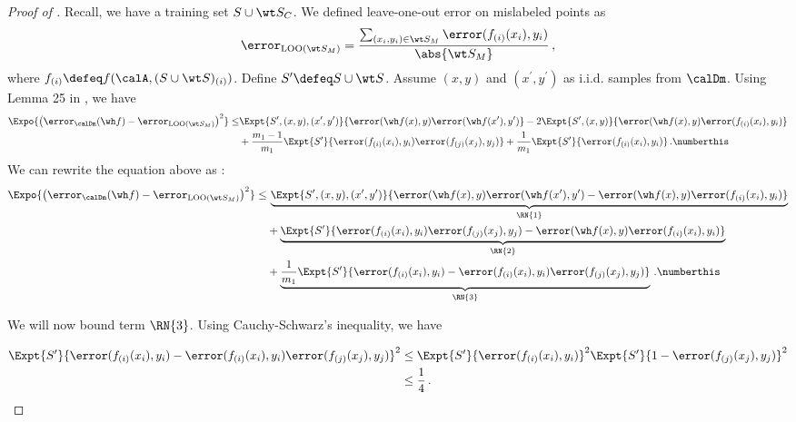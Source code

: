 \begin{proof}[Proof of ]
    Recall, we have a training set $S \cup \wt S_C$. We defined leave-one-out error on mislabeled points as $$\error_{\text{LOO}(\wt S_M) } = \frac{\sum_{(x_i, y_i) \in \wt S_M} \error( f_{(i)}( x_i), y_i)}{ \abs{\wt S_M }} \,, $$
    where $f_{(i)} \defeq f(\calA, (S \cup \wt S)_{(i)})$. Define $S^\prime \defeq S \cup \wt S$. Assume $(x,y)$ and $(x^\prime,y^\prime)$ as i.i.d. samples from ${\calDm}$. 
    Using Lemma 25 in \citet{bousquet2002stability}, we have
    \begin{align*}
        \Expo{ \left( \error_{\calDm}(\wh f) -\error_{\text{LOO}(\wt S_M) } \right)^2 } \le & \Expt{ S^\prime, (x,y), (x^\prime,y^\prime) }{ \error(\wh f(x), y ) \error(\wh f(x^\prime), y^\prime )} - 2 \Expt{ S^\prime, (x,y) }{ \error(\wh f(x), y ) \error(f_{(i)}(x_i), y_i )} \\
        & + \frac{m_1-1}{m_1}\Expt{ S^\prime }{  \error(f_{(i)}(x_i), y_i )  \error(f_{(j)}(x_j), y_j )} + \frac{1}{m_1} \Expt{ S^\prime }{  \error(f_{(i)}(x_i), y_i ) } \,. \numberthis \label{eq:main_reln}
    \end{align*}
    We can rewrite the equation above as : 
    \begin{align*}
        \Expo{ \left( \error_{\calDm}(\wh f) -\error_{\text{LOO}(\wt S_M) } \right)^2 } \le &  \, \underbrace{\Expt{ S^\prime, (x,y), (x^\prime,y^\prime) }{ \error(\wh f(x), y ) \error(\wh f(x^\prime), y^\prime ) - \error(\wh f(x), y ) \error(f_{(i)}(x_i), y_i )}}_{\RN{1}} \\
        & + \underbrace{\Expt{ S^\prime }{  \error(f_{(i)}(x_i), y_i )  \error(f_{(j)}(x_j), y_j ) -  \error(\wh f(x), y ) \error(f_{(i)}(x_i), y_i )}}_{\RN{2}} \\ &+ \underbrace{\frac{1}{m_1} \Expt{ S^\prime }{  \error(f_{(i)}(x_i), y_i ) - \error(f_{(i)}(x_i), y_i )  \error(f_{(j)}(x_j), y_j ) }}_{\RN{3}} \,. \numberthis \label{eq:main_reln2}
    \end{align*}
    
    We will now bound term $\RN{3}$.  Using Cauchy-Schwarz's inequality, we have
    
    \begin{align}
        \Expt{ S^\prime }{  \error(f_{(i)}(x_i), y_i ) - \error(f_{(i)}(x_i), y_i )  \error(f_{(j)}(x_j), y_j ) }^2 &\le  \Expt{ S^\prime }{  \error(f_{(i)}(x_i), y_i ) }^2 \Expt{S^\prime}{1 -   \error(f_{(j)}(x_j), y_j ) }^2 \\
        &\le \frac{1}{4} \,.\label{eq:term1_lem12}
    \end{align}
    

\end{proof}
